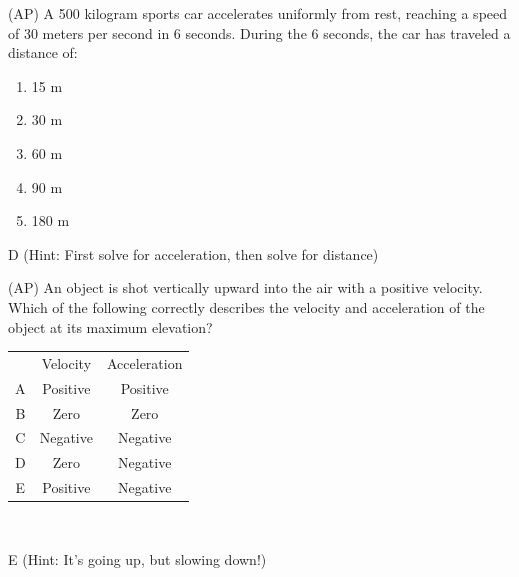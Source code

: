 \begin{question}
(AP) A 500 kilogram sports car accelerates uniformly from rest, reaching a speed of 30 meters per second in 6 seconds. During the 6 seconds, the car has traveled a distance of:
\begin{multicols}{5}
\begin{enumerate}[label=(\alph*)]
    \item 15 m
    \item 30 m
    \item 60 m
    \item 90 m
    \item 180 m
\end{enumerate}
\end{multicols}
\end{question}

\begin{solution}
D (Hint: First solve for acceleration, then solve for distance)
\end{solution}



\begin{question}
(AP) An object is shot vertically upward into the air with a positive velocity. Which of the following correctly describes the velocity and acceleration of the object at its maximum elevation?\\

\begin{tabular}{ |c|c|c| } 
 \hline
       & Velocity & Acceleration \\ 
 A     & Positive & Positive \\ 
 B     & Zero & Zero \\ 
 C     & Negative & Negative \\ 
 D     & Zero & Negative \\ 
 E     & Positive & Negative \\ 
 \hline
\end{tabular}\\

\end{question}

\begin{solution}
E (Hint: It's going up, but slowing down!)
\end{solution}

